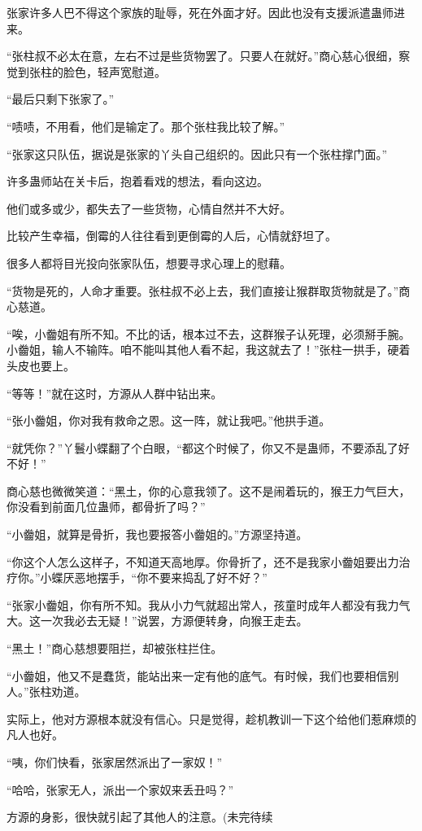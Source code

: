 \begin{this_body}
张家许多人巴不得这个家族的耻辱，死在外面才好。因此也没有支援派遣蛊师进来。

“张柱叔不必太在意，左右不过是些货物罢了。只要人在就好。”商心慈心很细，察觉到张柱的脸色，轻声宽慰道。

“最后只剩下张家了。”

“啧啧，不用看，他们是输定了。那个张柱我比较了解。”

“张家这只队伍，据说是张家的丫头自己组织的。因此只有一个张柱撑门面。”

许多蛊师站在关卡后，抱着看戏的想法，看向这边。

他们或多或少，都失去了一些货物，心情自然并不大好。

比较产生幸福，倒霉的人往往看到更倒霉的人后，心情就舒坦了。

很多人都将目光投向张家队伍，想要寻求心理上的慰藉。

“货物是死的，人命才重要。张柱叔不必上去，我们直接让猴群取货物就是了。”商心慈道。

“唉，小齤姐有所不知。不比的话，根本过不去，这群猴子认死理，必须掰手腕。小齤姐，输人不输阵。咱不能叫其他人看不起，我这就去了！”张柱一拱手，硬着头皮也要上。

“等等！”就在这时，方源从人群中钻出来。

“张小齤姐，你对我有救命之恩。这一阵，就让我吧。”他拱手道。

“就凭你？”丫鬟小蝶翻了个白眼，“都这个时候了，你又不是蛊师，不要添乱了好不好！”

商心慈也微微笑道：“黑土，你的心意我领了。这不是闹着玩的，猴王力气巨大，你没看到前面几位蛊师，都骨折了吗？”

“小齤姐，就算是骨折，我也要报答小齤姐的。”方源坚持道。

“你这个人怎么这样子，不知道天高地厚。你骨折了，还不是我家小齤姐要出力治疗你。”小蝶厌恶地摆手，“你不要来捣乱了好不好？”

“张家小齤姐，你有所不知。我从小力气就超出常人，孩童时成年人都没有我力气大。这一次我必去无疑！”说罢，方源便转身，向猴王走去。

“黑土！”商心慈想要阻拦，却被张柱拦住。

“小齤姐，他又不是蠢货，能站出来一定有他的底气。有时候，我们也要相信别人。”张柱劝道。

实际上，他对方源根本就没有信心。只是觉得，趁机教训一下这个给他们惹麻烦的凡人也好。

“咦，你们快看，张家居然派出了一家奴！”

“哈哈，张家无人，派出一个家奴来丢丑吗？”

方源的身影，很快就引起了其他人的注意。(未完待续

\end{this_body}

